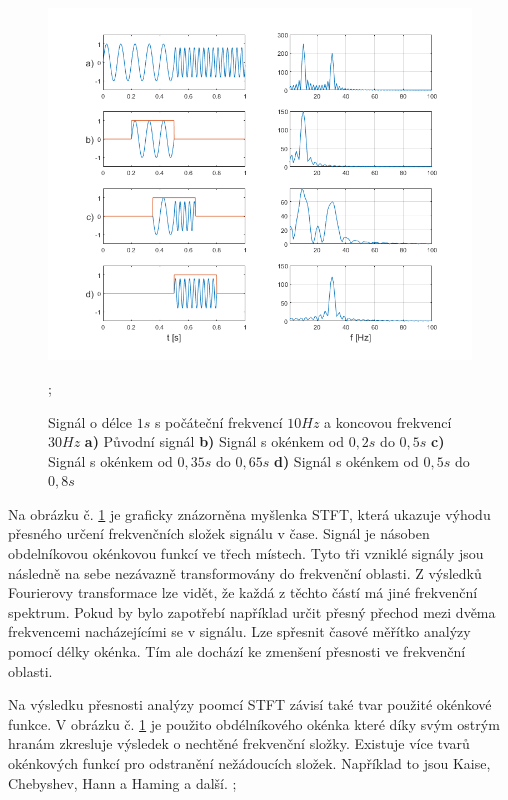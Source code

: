   \begin{figure}[H]
    \centering
    \includegraphics[width = 1\linewidth]{obrazky/STFT.png}
    \caption{Signál o délce $1 s$ s počáteční frekvencí $10 Hz$ a koncovou frekvencí $30 Hz$ \textbf{a)} Původní signál \textbf{b)} Signál s okénkem od $0,2 s$ do $0,5 s$ \textbf{c)} Signál s okénkem od $0,35 s$ do $0,65 s$ \textbf{d)} Signál s okénkem od $0,5 s$ do $0,8 s$};
    \label{fig:STFT}
  \end{figure}

  Na obrázku č. \ref*{fig:STFT} je graficky znázorněna myšlenka \acs{STFT}, která ukazuje výhodu přesného určení frekvenčních složek signálu v čase. 
  Signál je násoben obdelníkovou okénkovou funkcí ve třech místech.
  Tyto tři vzniklé signály jsou následně na sebe nezávazně transformovány do frekvenční oblasti.
  Z výsledků Fourierovy transformace lze vidět, že každá z těchto částí má jiné frekvenční spektrum.
  Pokud by bylo zapotřebí například určit přesný přechod mezi dvěma frekvencemi nacházejícími se v signálu. Lze spřesnit časové měřítko analýzy pomocí délky okénka.
  Tím ale dochází ke zmenšení přesnosti ve frekvenční oblasti.
  
  Na výsledku přesnosti analýzy poomcí \acs{STFT} závisí také tvar použité okénkové funkce.
  V obrázku č. \ref*{fig:STFT} je použito obdélníkového okénka které díky svým ostrým hranám zkresluje výsledek o nechtěné frekvenční složky.
  Existuje více tvarů okénkových funkcí pro odstranění nežádoucích složek.
  Například to jsou Kaise, Chebyshev, Hann a Haming a další.
  \cite{Time-frequency_distributions};

